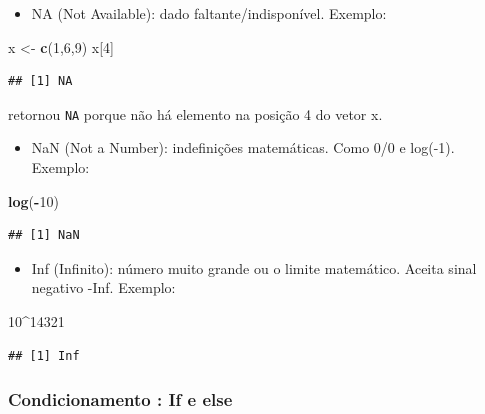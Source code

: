 \documentclass[
]{book}
\newenvironment{Shaded}{\begin{snugshade}}{\end{snugshade}}
\newcommand{\DecValTok}[1]{\textcolor[rgb]{0.00,0.00,0.81}{#1}}
\newcommand{\KeywordTok}[1]{\textcolor[rgb]{0.13,0.29,0.53}{\textbf{#1}}}
\newcommand{\NormalTok}[1]{#1}
\newcommand{\OperatorTok}[1]{\textcolor[rgb]{0.81,0.36,0.00}{\textbf{#1}}}
\newcommand{\StringTok}[1]{\textcolor[rgb]{0.31,0.60,0.02}{#1}}
\providecommand{\tightlist}{%
  \setlength{\itemsep}{0pt}\setlength{\parskip}{0pt}}
\begin{document}
\begin{itemize}
\tightlist
\item
  NA (Not Available): dado faltante/indisponível. Exemplo:
\end{itemize}

\begin{Shaded}
\begin{Highlighting}[]
\NormalTok{x <-}\StringTok{ }\KeywordTok{c}\NormalTok{(}\DecValTok{1}\NormalTok{,}\DecValTok{6}\NormalTok{,}\DecValTok{9}\NormalTok{)}
\NormalTok{x[}\DecValTok{4}\NormalTok{]}
\end{Highlighting}
\end{Shaded}

\begin{verbatim}
## [1] NA
\end{verbatim}

retornou \texttt{NA} porque não há elemento na posição 4 do vetor x.

\begin{itemize}
\tightlist
\item
  NaN (Not a Number): indefinições matemáticas. Como 0/0 e log(-1).
  Exemplo:
\end{itemize}

\begin{Shaded}
\begin{Highlighting}[]
\KeywordTok{log}\NormalTok{(}\OperatorTok{-}\DecValTok{10}\NormalTok{)}
\end{Highlighting}
\end{Shaded}

\begin{verbatim}
## [1] NaN
\end{verbatim}

\begin{itemize}
\tightlist
\item
  Inf (Infinito): número muito grande ou o limite matemático. Aceita sinal negativo -Inf.
  Exemplo:
\end{itemize}

\begin{Shaded}
\begin{Highlighting}[]
\DecValTok{10}\OperatorTok{^}\DecValTok{14321}
\end{Highlighting}
\end{Shaded}

\begin{verbatim}
## [1] Inf
\end{verbatim}

\hypertarget{condicionamento-if-e-else}{%
\subsubsection{Condicionamento : If e else}\label{condicionamento-if-e-else}}
\end{document}
